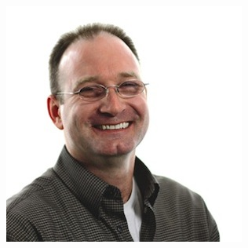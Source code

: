 \documentclass[xcolor=dvipsnames,red]{beamer}
\begin{document}
\begin{frame}
\begin{columns}
\begin{column}{.25\textwidth}
\includegraphics[width=.75\textwidth]{imgs/jeff_persch.jpg}
\end{column}


\end{columns}
\end{frame}
\end{document}
